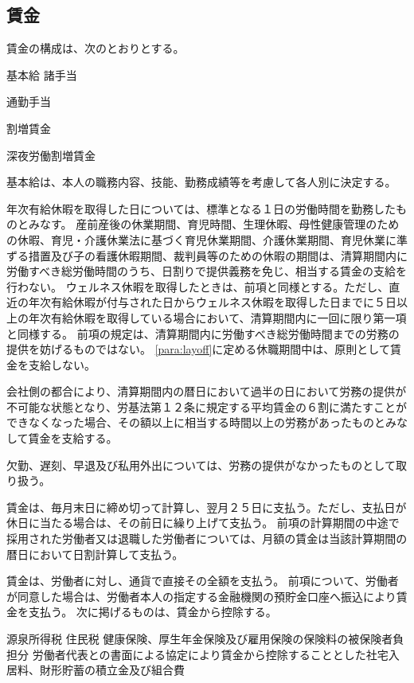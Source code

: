 \documentclass[10pt,a4paper,uplatex]{jsarticle}
\begin{document}
\subsection{賃金}

賃金の構成は、次のとおりとする。
\begin{enumerate}
    \itm 基本給
    \itm 諸手当
    \begin{enumerate}
        \itm 通勤手当
    \end{enumerate}
    \itm 割増賃金
    \begin{enumerate}
        \itm 深夜労働割増賃金
    \end{enumerate}
\end{enumerate}

基本給は、本人の職務内容、技能、勤務成績等を考慮して各人別に決定する。

年次有給休暇を取得した日については、標準となる１日の労働時間を勤務したものとみなす。
\term
産前産後の休業期間、育児時間、生理休暇、母性健康管理のための休暇、育児・介護休業法に基づく育児休業期間、介護休業期間、育児休業に準ずる措置及び子の看護休暇期間、裁判員等のための休暇の期間は、清算期間内に労働すべき総労働時間のうち、日割りで提供義務を免じ、相当する賃金の支給を行わない。 
\term 
ウェルネス休暇を取得したときは、前項と同様とする。ただし、直近の年次有給休暇が付与された日からウェルネス休暇を取得した日までに５日以上の年次有給休暇を取得している場合において、清算期間内に一回に限り第一項と同様する。
\term
前項の規定は、清算期間内に労働すべき総労働時間までの労務の提供を妨げるものではない。
\term
\ref{para:layoff}に定める休職期間中は、原則として賃金を支給しない。

会社側の都合により、清算期間内の暦日において過半の日において労務の提供が不可能な状態となり、労基法第１２条に規定する平均賃金の６割に満たすことができなくなった場合、その額以上に相当する時間以上の労務があったものとみなして賃金を支給する。

欠勤、遅刻、早退及び私用外出については、労務の提供がなかったものとして取り扱う。

賃金は、毎月末日に締め切って計算し、翌月２５日に支払う。ただし、支払日が休日に当たる場合は、その前日に繰り上げて支払う。
\term
前項の計算期間の中途で採用された労働者又は退職した労働者については、月額の賃金は当該計算期間の暦日において日割計算して支払う。

賃金は、労働者に対し、通貨で直接その全額を支払う。
\term
前項について、労働者が同意した場合は、労働者本人の指定する金融機関の預貯金口座へ振込により賃金を支払う。
\term
次に掲げるものは、賃金から控除する。
\begin{enumerate}
    \itm 源泉所得税
    \itm 住民税
    \itm 健康保険、厚生年金保険及び雇用保険の保険料の被保険者負担分
    \itm 労働者代表との書面による協定により賃金から控除することとした社宅入居料、財形貯蓄の積立金及び組合費
\end{enumerate}
\end{document}
